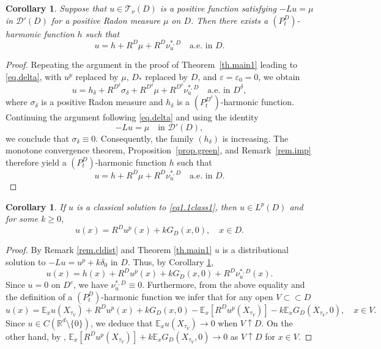 \documentclass[11pt,a4paper,reqno]{amsart}
\newtheorem{corollary}[theorem]{\bf Corollary}
\theoremstyle{definition}
\numberwithin{equation}{section}
\begin{document}
\begin{corollary}
\label{rem.ineq}
Suppose that $u\in \mathscr T_\nu(D)$ is a positive function  satisfying $-Lu=\mu$ in $\mathscr D'(D)$
for a positive Radon measure $\mu$ on $D$. Then there exists a $(P^D_t)$-harmonic function $h$ such that
\begin{equation}
\label{eq4.4ad}
u=h+R^{D}\mu+R^{D}\nu^{*,D}_{u}\quad\text{a.e. in }D.
\end{equation}
\end{corollary}
\begin{proof}
Repeating the argument in the proof of Theorem~\ref{th.main1} leading
to \eqref{eq.delta}, with $u^p$ replaced by $\mu$, $D_*$ replaced by
$D$, and $\varepsilon=\varepsilon_0=0$, we obtain
\[
u=h_\delta+R^{D^\delta}\sigma_\delta+R^{D^\delta}\mu+R^{D^\delta}\nu^{*,D}_u
\quad\text{a.e. in }D^\delta,
\]
where $\sigma_\delta$ is a positive Radon measure and $h_\delta$ is a
$(P_t^{D^\delta})$-harmonic function. Continuing the argument
following \eqref{eq.delta} and using the identity
\[
-Lu=\mu
\quad\text{in }\mathscr D'(D),
\]
we conclude that $\sigma_\delta\equiv0$. Consequently, the family
$(h_\delta)$ is increasing. The monotone convergence theorem,
Proposition~\ref{prop.green}, and Remark~\ref{rem.imp} therefore yield a
$(P_t^D)$-harmonic function $h$ such that
\[
u=h+R^D\mu+R^D\nu^{*,D}_u\quad\text{a.e. in }D.
\]
\end{proof}





\begin{corollary}
\label{cor.repr194}
If $u$ is a classical solution to \eqref{eq1.1class1}, then $u\in L^p(D)$ and for some $k\ge 0$,
\begin{equation}
\label{eq.repfor23}
u(x)=R^Du^p(x)+kG_D(x,0),\quad x\in D.
\end{equation}
\end{corollary}
\begin{proof}
By Remark \ref{rem.cldist} and Theorem \ref{th.main1} $u$ is a distributional solution to $-Lu=u^p+k\delta_{0}$ in $D$. Thus, by Corollary \ref{rem.ineq}, 
\[
u(x)=h(x)+R^Du^p(x)+kG_D(x,0)+R^{D}\nu^{*,D}_{u}(x).
\]
Since $u=0$ on $D^c$, we have $\nu^{*,D}_{u}\equiv 0$. Furthermore, from  the above equality and  the definition of a $(P^D_t)$-harmonic function
we infer that for any open $V\subset\subset D$
\begin{equation}
\label{eq.harmrepr1}
u(x)=\mathbb E_xu(X_{\tau_V})+R^Du^p(x)+kG_D(x,0)-\mathbb E_x[R^Du^p(X_{\tau_V})]-k\mathbb E_xG_D(X_{\tau_V},0),\quad x\in V.
\end{equation}
Since $u\in C(\mathbb R^d\setminus\{0\})$, we deduce that $\mathbb E_xu(X_{\tau_V})\to 0$ when $V\uparrow D$. On the other hand,
by \cite[Proposition VI.2.10]{BG}, $\mathbb E_x[R^Du^p(X_{\tau_V})]+k\mathbb E_xG_D(X_{\tau_V},0)\to 0$ as $V\uparrow D$ for $x\in V$.
\end{proof}
\end{document}
